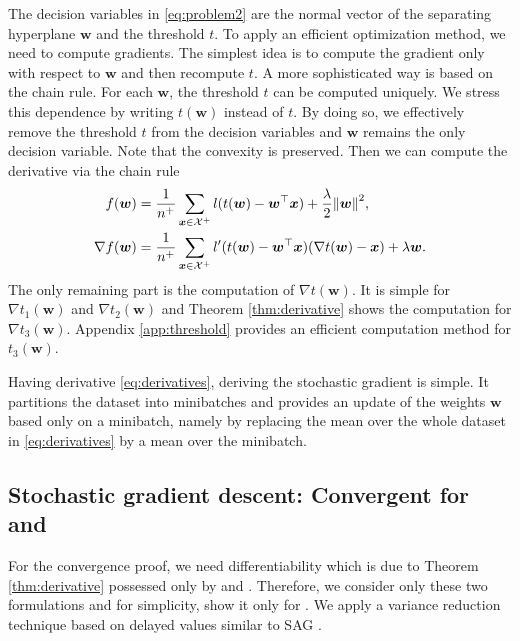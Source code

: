 The decision variables in \eqref{eq:problem2} are the normal vector of the separating hyperplane $\bm{w}$ and the threshold $t$. To apply an efficient optimization method, we need to compute gradients. The simplest idea \cite{grill2016learning} is to compute the gradient only with respect to $\bm{w}$ and then recompute $t$. A more sophisticated way is based on the chain rule. For each $\bm{w}$, the threshold $t$ can be computed uniquely. We stress this dependence by writing $t(\bm{w})$ instead of $t$. By doing so, we effectively remove the threshold $t$ from the decision variables and $\bm{w}$ remains the only decision variable. Note that the convexity is preserved. Then we can compute the derivative via the chain rule
\begin{equation}\label{eq:derivatives}
  \begin{aligned}
  f(\bm{w}) & = \frac{1}{n^+}\sum_{\bm{x} \in \Xc^+} l(t(\bm{w}) - \bm{w}^\top \bm{x}) + \frac{\lambda}{2}\norm{\bm{w}}^2, \\
  \nabla f(\bm{w}) & = \frac{1}{n^+}\sum_{\bm{x} \in \Xc^+} l'(t(\bm{w}) - \bm{w}^\top \bm{x})(\nabla t(\bm{w}) - \bm{x}) + \lambda \bm{w}.
  \end{aligned}
\end{equation}
The only remaining part is the computation of $\nabla t(\bm{w})$. It is simple for $\nabla t_1(\bm{w})$ and $\nabla t_2(\bm{w})$ and Theorem \ref{thm:derivative} shows the computation for $\nabla t_3(\bm{w})$. Appendix \ref{app:threshold} provides an efficient computation method for $t_3(\bm{w})$.

Having derivative \eqref{eq:derivatives}, deriving the stochastic gradient is simple. It partitions the dataset into minibatches and provides an update of the weights $\bm{w}$ based only on a minibatch, namely by replacing the mean over the whole dataset in \eqref{eq:derivatives} by a mean over the minibatch.

\subsection{Stochastic gradient descent: Convergent for \PatMat and \PatMatNP}

For the convergence proof, we need differentiability which is due to Theorem \ref{thm:derivative} possessed only by \PatMat and \PatMatNP. Therefore, we consider only these two formulations and for simplicity, show it only for \PatMat. We apply a variance reduction technique based on delayed values similar to SAG \cite{schmidt2017minimizing}. 

